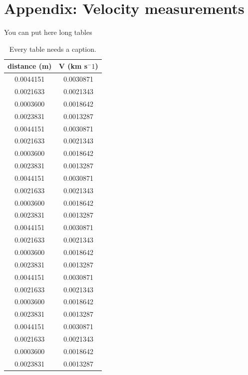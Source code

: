 \documentclass[letterpaper,11pt]{article}
\begin{document}
\section*{Appendix: Velocity measurements}
You can put here long tables 
\begin{table}[ht]
\begin{center}
\caption{Every table needs a caption.}
\label{table2} 
\begin{tabular}{cc} 
\hline
\multicolumn{1}{c}{distance (m)} & \multicolumn{1}{c}{V (km s$^-1$)} \\
\hline
0.0044151 &   0.0030871 \\
0.0021633 &   0.0021343 \\
0.0003600 &   0.0018642 \\
0.0023831 &   0.0013287 \\
0.0044151 &   0.0030871 \\
0.0021633 &   0.0021343 \\
0.0003600 &   0.0018642 \\
0.0023831 &   0.0013287 \\
0.0044151 &   0.0030871 \\
0.0021633 &   0.0021343 \\
0.0003600 &   0.0018642 \\
0.0023831 &   0.0013287 \\
0.0044151 &   0.0030871 \\
0.0021633 &   0.0021343 \\
0.0003600 &   0.0018642 \\
0.0023831 &   0.0013287 \\
0.0044151 &   0.0030871 \\
0.0021633 &   0.0021343 \\
0.0003600 &   0.0018642 \\
0.0023831 &   0.0013287 \\
0.0044151 &   0.0030871 \\
0.0021633 &   0.0021343 \\
0.0003600 &   0.0018642 \\
0.0023831 &   0.0013287 \\
\hline
\end{tabular}
\end{center}
\end{table}
\end{document}
